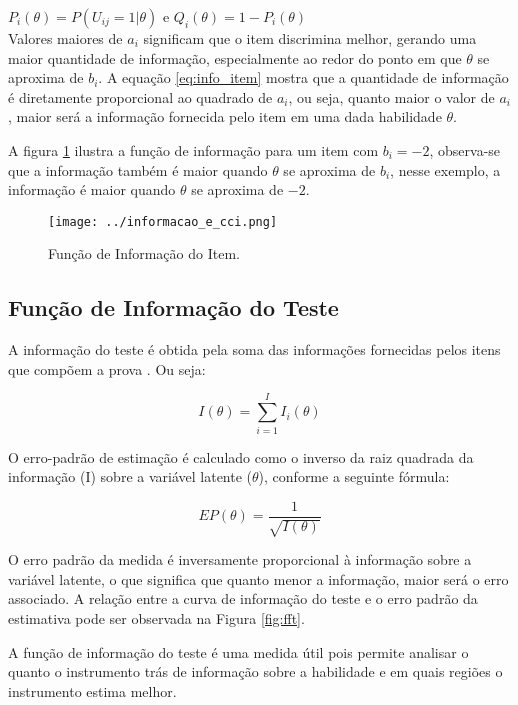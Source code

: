 \noindent $P_i(\theta) = P(U_{ij} = 1| \theta) $ e $ Q_i(\theta) = 1 - P_i(\theta) $ \\

Valores maiores de $a_i$ significam que o item discrimina melhor, gerando uma maior quantidade de informação, especialmente ao redor do ponto em que $\theta$ se aproxima de $b_i$. A equação \ref{eq:info_item} mostra que a quantidade de informação é diretamente proporcional ao quadrado de $a_i$, ou seja, quanto maior o valor de $a_i$, maior será a informação fornecida pelo item em uma dada habilidade $\theta$.

A figura \ref{fig:fii} ilustra a função de informação para um item com $b_i = -2$, observa-se que a informação também é maior quando $\theta$ se aproxima de $b_i$, nesse exemplo, a informação é maior quando $\theta$ se aproxima de $-2$.

\begin{figure}[H]
	\centering
	\caption{Função de Informação do Item.}
	\texttt{[image: ../informacao\_e\_cci.png]}
		\parbox{\textwidth}{
		\centering %
	}
	\label{fig:fii}
\end{figure}

\subsection{Função de Informação do Teste}

A informação do teste é obtida pela soma das informações fornecidas pelos itens que compõem a prova \cite{de2000teoria}. Ou seja:

\begin{equation}\label{eq:info_teste}
I(\theta) = \sum_{i=1}^{I}I_i(\theta)
\end{equation}

 O erro-padrão de estimação é calculado como o inverso da raiz quadrada da informação (I) sobre a variável latente ($\theta$), conforme a seguinte fórmula:

\[
EP(\theta) = \dfrac{1}{\sqrt{I(\theta)}}
\]


O erro padrão da medida é inversamente proporcional à informação sobre a variável latente, o que significa que quanto menor a informação, maior será o erro associado. A relação entre a curva de informação do teste e o erro padrão da estimativa pode ser observada na Figura \ref{fig:fft}.

A função de informação do teste é uma medida útil pois permite analisar o quanto o instrumento trás de informação sobre a habilidade e em quais regiões o instrumento estima melhor.

